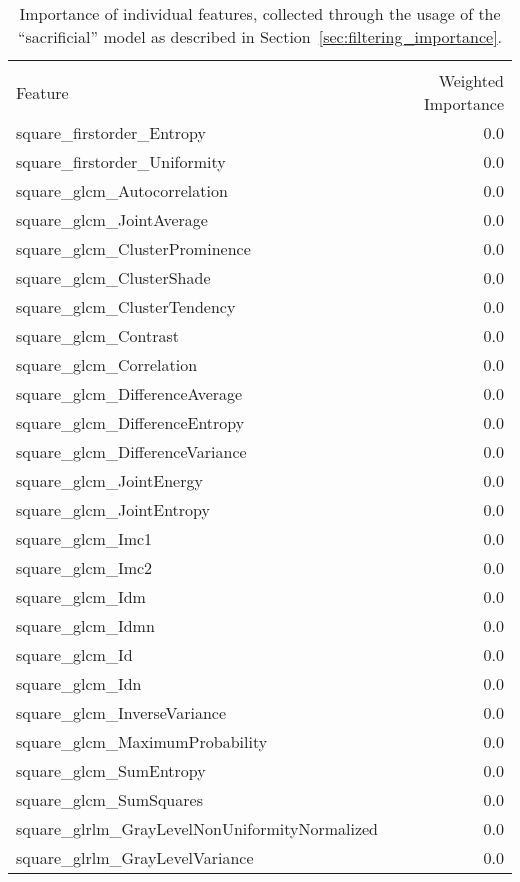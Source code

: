 {\tiny
  \begin{xltabular}[H]{\textwidth}{X r}
    \caption{Importance of individual features, collected through the usage of the \enquote{sacrificial} model as described in Section~\ref{sec:filtering_importance}.}\label{tbl:importances}\endlastfoot\\
        Feature & Weighted Importance \\\hline\endhead
        square\_firstorder\_Entropy & 0.0 \\
        square\_firstorder\_Uniformity & 0.0 \\
        square\_glcm\_Autocorrelation & 0.0 \\
        square\_glcm\_JointAverage & 0.0 \\
        square\_glcm\_ClusterProminence & 0.0 \\
        square\_glcm\_ClusterShade & 0.0 \\
        square\_glcm\_ClusterTendency & 0.0 \\
        square\_glcm\_Contrast & 0.0 \\
        square\_glcm\_Correlation & 0.0 \\
        square\_glcm\_DifferenceAverage & 0.0 \\
        square\_glcm\_DifferenceEntropy & 0.0 \\
        square\_glcm\_DifferenceVariance & 0.0 \\
        square\_glcm\_JointEnergy & 0.0 \\
        square\_glcm\_JointEntropy & 0.0 \\
        square\_glcm\_Imc1 & 0.0 \\
        square\_glcm\_Imc2 & 0.0 \\
        square\_glcm\_Idm & 0.0 \\
        square\_glcm\_Idmn & 0.0 \\
        square\_glcm\_Id & 0.0 \\
        square\_glcm\_Idn & 0.0 \\
        square\_glcm\_InverseVariance & 0.0 \\
        square\_glcm\_MaximumProbability & 0.0 \\
        square\_glcm\_SumEntropy & 0.0 \\
        square\_glcm\_SumSquares & 0.0 \\
        square\_glrlm\_GrayLevelNonUniformityNormalized & 0.0 \\
        square\_glrlm\_GrayLevelVariance & 0.0 \\

\end{xltabular}}
